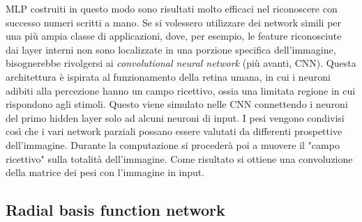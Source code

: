 \documentclass[10pt,a4paper]{article}
\begin{document}
MLP costruiti in questo modo sono risultati molto efficaci nel riconoscere con successo numeri scritti a mano. Se si volessero utilizzare dei network simili per una più ampia classe di applicazioni, dove, per esempio, le feature riconosciute dai layer interni non sono localizzate in una porzione specifica dell'immagine, bisognerebbe rivolgersi ai \emph{convolutional neural network} (più avanti, CNN). Questa architettura è ispirata al funzionamento della retina umana, in cui i neuroni adibiti alla percezione hanno un campo ricettivo, ossia una limitata regione in cui rispondono agli stimoli. Questo viene simulato nelle CNN connettendo i neuroni del primo hidden layer solo ad alcuni neuroni di input. I pesi vengono condivisi così che i vari network parziali possano essere valutati da differenti prospettive dell'immagine. Durante la computazione si procederà poi a muovere il "campo ricettivo" sulla totalità dell'immagine. Come risultato si ottiene una convoluzione della matrice dei pesi con l'immagine in input.

\subsection{Radial basis function network}
\end{document}
